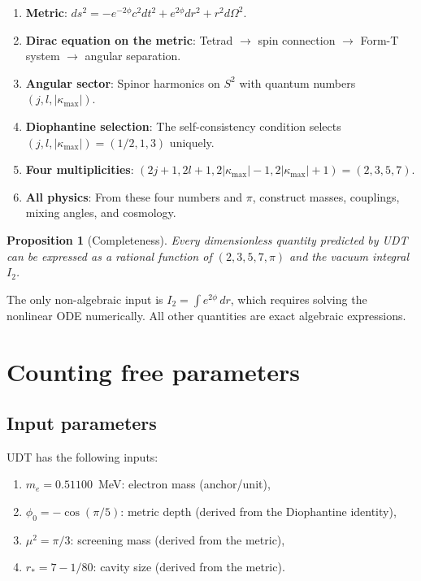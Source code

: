 \documentclass[11pt,letterpaper]{article}
\newtheorem{proposition}[theorem]{Proposition}
\numberwithin{equation}{section}
\begin{document}
\begin{enumerate}
  \item \textbf{Metric}: $ds^2 = -e^{-2\phi}c^2dt^2 + e^{2\phi}dr^2 + r^2d\Omega^2$.

  \item \textbf{Dirac equation on the metric}: Tetrad $\to$ spin connection
    $\to$ Form-T system $\to$ angular separation.

  \item \textbf{Angular sector}: Spinor harmonics on $S^2$ with quantum
    numbers $(j, l, |\kappa_\mathrm{max}|)$.

  \item \textbf{Diophantine selection}: The self-consistency condition
    selects $(j, l, |\kappa_\mathrm{max}|) = (1/2, 1, 3)$ uniquely.

  \item \textbf{Four multiplicities}: $(2j+1, 2l+1, 2|\kappa_\mathrm{max}|-1, 2|\kappa_\mathrm{max}|+1) = (2, 3, 5, 7)$.

  \item \textbf{All physics}: From these four numbers and $\pi$, construct
    masses, couplings, mixing angles, and cosmology.
\end{enumerate}

\begin{proposition}[Completeness]
Every dimensionless quantity predicted by UDT can be expressed as a rational
function of $(2, 3, 5, 7, \pi)$ and the vacuum integral $I_2$.
\end{proposition}

The only non-algebraic input is $I_2 = \int e^{2\phi}\,dr$, which requires
solving the nonlinear ODE numerically. All other quantities are exact
algebraic expressions.

\section{Counting free parameters}
\label{sec:free_params}

\subsection{Input parameters}

UDT has the following inputs:
\begin{enumerate}
  \item $m_e = 0.51100$~MeV: electron mass (anchor/unit),
  \item $\phi_0 = -\cos(\pi/5)$: metric depth (derived from the Diophantine identity),
  \item $\mu^2 = \pi/3$: screening mass (derived from the metric),
  \item $r_* = 7 - 1/80$: cavity size (derived from the metric).
\end{enumerate}
\end{document}
